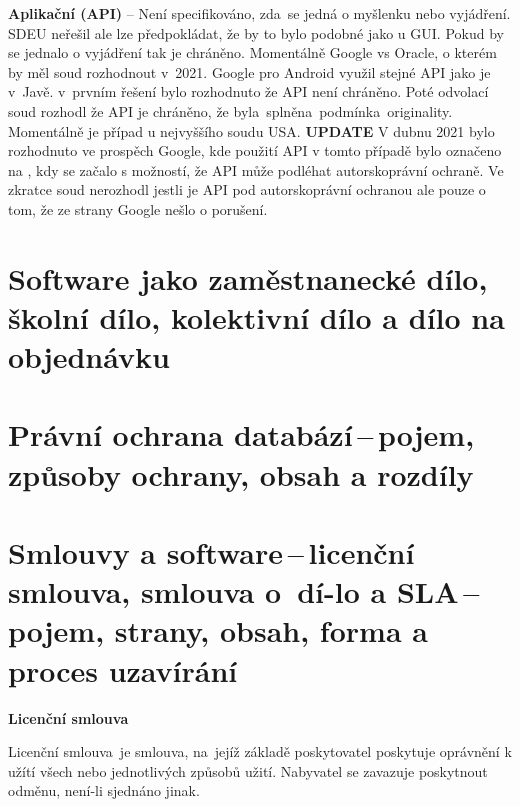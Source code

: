 \textbf{Aplikační (API)} -- Není specifikováno, zda~se jedná o myšlenku nebo vyjádření. SDEU neřešil ale lze předpokládat, že by to bylo podobné jako u GUI. Pokud by se jednalo o vyjádření tak je chráněno. Momentálně Google vs Oracle, o kterém by měl soud rozhodnout v~2021. Google pro Android využil stejné API jako je v~Javě. v~prvním řešení bylo rozhodnuto že API není chráněno. Poté odvolací soud rozhodl že API je chráněno, že byla~splněna~podmínka~originality. Momentálně je případ u nejvyššího soudu USA. \textbf{UPDATE} V dubnu 2021 bylo rozhodnuto ve prospěch Google, kde použití API v tomto případě bylo označeno na , kdy se začalo s možností, že API může podléhat autorskoprávní ochraně. Ve zkratce soud nerozhodl jestli je API pod autorskoprávní ochranou ale pouze o tom, že ze strany Google nešlo o porušení.  




\newpage
\section{Software jako zaměstnanecké dílo, školní dílo, kolektivní dílo a dílo na objednávku}











\newpage
\section{Právní ochrana databází\,--\,pojem, způsoby ochrany, obsah a rozdíly}











\newpage
\section[Smlouvy a software\,--\,licenční smlouva, smlouva o~dílo a SLA\,--\,pojem, strany, obsah, forma a proces uzavírání]{Smlouvy a software\,--\,licenční smlouva, smlouva o~dí-lo a SLA\,--\,pojem, strany, obsah, forma a proces uzavírání}

\begin{Large}
\textbf{Licenční smlouva}
\end{Large} 

Licenční smlouva~je smlouva, na~jejíž základě poskytovatel poskytuje oprávnění k užítí všech nebo jednotlivých způsobů užití. Nabyvatel se zavazuje poskytnout odměnu, není-li sjednáno jinak. 

